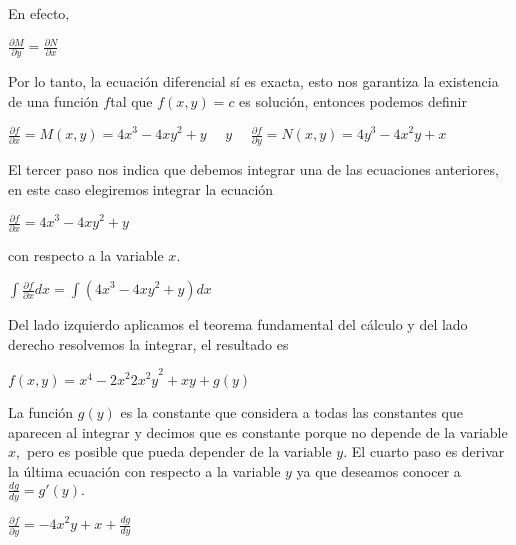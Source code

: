 \documentclass[l etterpaper,11pt]{article}
\begin{document}
En efecto,
\begin{center}
$\frac{\partial M}{\partial y}=\frac{\partial N}{\partial x}$\\
\end{center}

Por lo tanto, la ecuación diferencial sí es exacta, esto nos garantiza la existencia de una función $ f $tal que $ f(x,y)=c $ es solución, entonces podemos definir
\begin{center}

$\frac{\partial f}{\partial x}=M(x,y)={4x}^3-{4xy}^2+y\ \ \ \ \ \ y\ \ \ \ \ \ \frac{\partial f}{\partial y}=N(x,y)={4y}^3-{4x}^2y+x$\\

\end{center}

El tercer paso nos indica que debemos integrar una de las ecuaciones anteriores, en este caso elegiremos integrar la ecuación
\begin{center}

$\frac{\partial f}{\partial x}={4x}^3-{4xy}^2+y$\\
\end{center}

con respecto a la variable $ x.$
\begin{center}

$\int\frac{\partial f}{\partial x}dx=\int({4x}^3-{4xy}^2+y)dx$\\
\end{center}

Del lado izquierdo aplicamos el teorema fundamental del cálculo y del lado derecho resolvemos la integrar, el resultado es
\begin{center}

$f(x,y)=x^4-{2x}^2{{2x}^2y}^2+xy+g(y)$\\
\end{center}

La función $ g(y) $ es la constante que considera a todas las constantes que aparecen al integrar y decimos que es constante porque no depende de la variable $ x, $ pero es posible que pueda depender de la variable $y$.
El cuarto paso es derivar la última ecuación con respecto a la variable $ y $ ya que deseamos conocer a $\frac{dg}{dy}=g\prime(y).$
\begin{center}

$\frac{\partial f}{\partial y}=-{4x}^2y+x+\frac{dg}{dy}$\\
\end{center}
\end{document}
